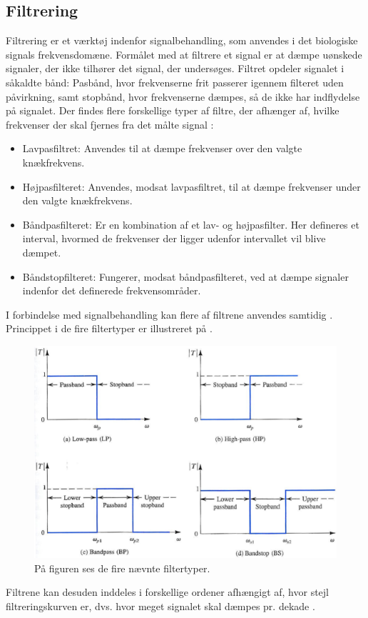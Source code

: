 \subsection{Filtrering}\label{Filterafsnit}
Filtrering er et værktøj indenfor signalbehandling, som anvendes i det biologiske signals frekvensdomæne. Formålet med at filtrere et signal er at dæmpe uønskede signaler, der ikke tilhører det signal, der undersøges. Filtret opdeler signalet i såkaldte bånd: Pasbånd, hvor frekvenserne frit passerer igennem filteret uden påvirkning, samt stopbånd, hvor frekvenserne dæmpes, så de ikke har indflydelse på signalet. 
Der findes flere forskellige typer af filtre, der afhænger af, hvilke frekvenser der skal fjernes fra det målte signal \cite{Devasahayam2000}:

\begin{itemize}
	\item Lavpasfiltret: Anvendes til at dæmpe frekvenser over den valgte knækfrekvens. 
	\item Højpasfilteret: Anvendes, modsat lavpasfiltret, til at dæmpe frekvenser under den valgte knækfrekvens. 
	\item Båndpasfilteret: Er en kombination af et lav- og højpasfilter.  Her defineres et interval, hvormed de frekvenser der ligger udenfor intervallet vil blive dæmpet.
	\item Båndstopfilteret: Fungerer, modsat båndpasfilteret, ved at dæmpe signaler indenfor det definerede frekvensområder. 
\end{itemize}
  
\noindent I forbindelse med signalbehandling kan flere af filtrene anvendes samtidig \cite{Devasahayam2000}. Princippet i de fire filtertyper er illustreret på .
\begin{figure}[H]
\centering
\includegraphics[scale=0.5]{figures/bproblemanalyse/filtertyper2.png}
\caption{På figuren ses de fire nævnte filtertyper. \cite{Sedra2010}}
\label{filtertyper}
\end{figure}
\noindent Filtrene kan desuden inddeles i forskellige ordener afhængigt af, hvor stejl filtreringskurven er, dvs. hvor meget signalet skal dæmpes pr. dekade \cite{Sedra2010}.

